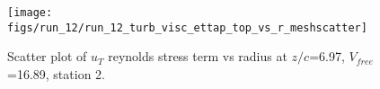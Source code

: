 \begin{figure}[H]
\centering
\texttt{[image: figs/run\_12/run\_12\_turb\_visc\_ettap\_top\_vs\_r\_meshscatter]}
\caption{Scatter plot of $
u_T$ reynolds stress term vs radius at $z/c$=6.97, $V_{free}$=16.89, station 2.}
\label{fig:run_12_turb_visc_ettap_top_vs_r_meshscatter}
\end{figure}



